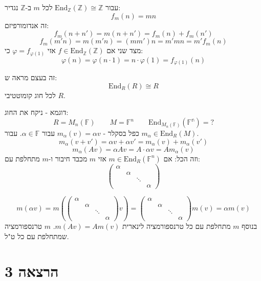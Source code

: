 \documentclass{tstextbook}
\begin{document}
\begin{example}
עבור \(\mathrm{End}_{\mathbb{Z}}(\mathbb{Z})\cong \mathbb{Z}\) לכל \(m\) ב-\(\mathbb{Z}\) נגדיר:
$$f_{m}(n)=mn$$
זה אנדומורפיזם:
$$f_{m}(n+n')=m(n+n')=f_{m}(n)+f_{m}(n')$$$$f_{m}(m'n)=m(m'n)=(mm')n=m'mn=m'f_{m}(n)$$
מצד שני אם \(f \in \mathrm{End}_{\mathbb{Z}}(\mathbb{Z})\) אזי \(\varphi=f_{\varphi(1)}\) כי:
$$\varphi(n)=\varphi(n\cdot 1)=n\cdot \varphi( 1)=f_{\varphi(1)}(n)$$

\end{example}
זה בעצם מראה ש:
$$\mathrm{End}_{R}(R)\cong  R$$
לכל חוג קומוטטיבי \(R\). 

דוגמא - ניקח את החוג:
$$R=M_{n}(\mathbb{F} )\qquad M=\mathbb{F} ^{n}\qquad \mathrm{End}_{M_{n}(\mathbb{F} )}(\mathbb{F^{n}} )=?$$
כפל בסקלר - \(m_{\alpha}(v)=\alpha v\) עבור \(\alpha \in \mathbb{F}\). עבור \(m_{\alpha}\in \mathrm{End}_{R}(M)\).
$$m_{\alpha}(v+v')=\alpha v+\alpha v'=m_{\alpha}(v)+m_{\alpha}(v')$$$$m_{\alpha}(Av)=\alpha Av=A\cdot \alpha v=Am_{\alpha}(v)$$
וזה הכל: אם \(m \in \mathrm{End}_{R}(\mathbb{F}^{n})\) אזי \(m\) מכבד חיבור ו-\(m\) מתחלפת עם:
$$\begin{pmatrix}\alpha &  &  &      \\ & \alpha &  &      \\ &  &   \ddots &    \\ &  &    & \alpha   
\end{pmatrix}$$

$$m(\alpha v)=m(\begin{pmatrix}\alpha &  &  &      \\ & \alpha &  &      \\ &  &   \ddots &    \\ &  &    & \alpha   \end{pmatrix}v)=\begin{pmatrix}\alpha &  &  &      \\ & \alpha &  &      \\ &  &   \ddots &    \\ &  &    & \alpha   
\end{pmatrix}m(v)=\alpha m(v)$$
בנוסף \(m\) מתחלפת עם כל טרנספורמציה לינארית \(m(Av)=Am(v)\). \(m\) טרנספורמציה שמתחלפת עם כל ט"ל.

\section{הרצאה 3}
\end{document}
